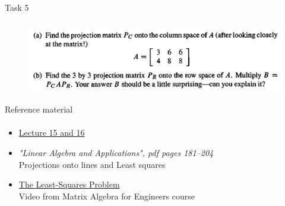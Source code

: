 \documentclass[aspectratio=169]{beamer}
\newcommand{\fbckg}[1]{\usebackgroundtemplate{\texttt{[image: \#1]}}}%
\begin{document}
\begin{frame}[t]{Task 5}
    \framesubtitle{}
    \begin{figure}[H]
        \centering\includegraphics[height=3cm,width=1\textwidth,keepaspectratio]{5.png}
        \label{fig:5.png}
    \end{figure}
\end{frame}


\begin{frame}[t]{Reference material}
    \framesubtitle{}
    \Large
    \begin{itemize}
        \item \href{https://www.youtube.com/watch?v=Y_Ac6KiQ1t0&list=PL49CF3715CB9EF31D&index=15}{Lecture 15 and 16}
        \item \textit{"Linear Algebra and Applications", pdf pages 181--204 }\\ Projections onto lines and Least squares
        \item \href{https://www.coursera.org/lecture/matrix-algebra-engineers/the-least-squares-problem-I56Qy}{The Least-Squares Problem}\\ Video from Matrix Algebra for Engineers course
    \end{itemize}
\end{frame}

\usebackgroundtemplate{}
% 

\fbckg{fibeamer/figs/last_page.png}
\frame[plain]{}
\end{document}
